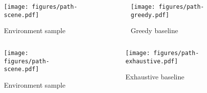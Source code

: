 \begin{frame}
    \begin{columns}
        \begin{column}{0.55\textwidth}
            \begin{figure}
                \centering
                \texttt{[image: figures/path-scene.pdf]}
                \par Environment sample
            \end{figure}
        \end{column}
        \begin{column}{0.5\textwidth}
            \begin{figure}
                \centering
                \texttt{[image: figures/path-greedy.pdf]}
                \par Greedy baseline
            \end{figure}
        \end{column}
    \end{columns}
\end{frame}

\begin{frame}
    \begin{columns}
        \begin{column}{0.55\textwidth}
            \begin{figure}
                \centering
                \texttt{[image: figures/path-scene.pdf]}
                \par Environment sample
            \end{figure}
        \end{column}
        \begin{column}{0.5\textwidth}
            \begin{figure}
                \centering
                \texttt{[image: figures/path-exhaustive.pdf]}
                \par Exhaustive baseline
            \end{figure}
        \end{column}
    \end{columns}
\end{frame}

